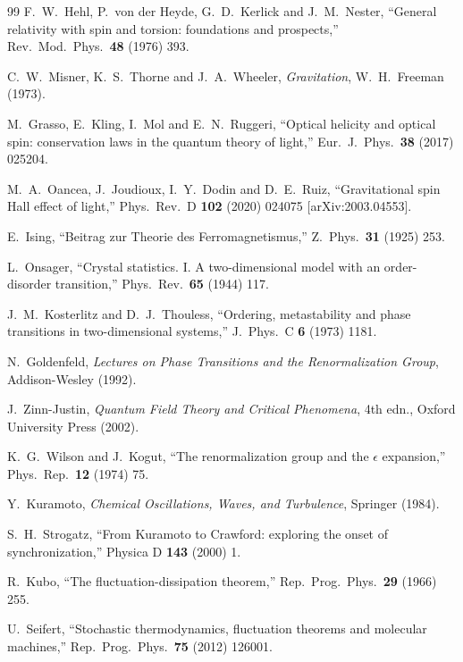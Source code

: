 \documentclass[12pt]{article}
\theoremstyle{definition}
\begin{document}
\begin{thebibliography}{99}
F.~W.~Hehl, P.~von der Heyde, G.~D.~Kerlick and J.~M.~Nester,
``General relativity with spin and torsion: foundations and prospects,''
Rev.\ Mod.\ Phys.\ \textbf{48} (1976) 393.

C.~W.~Misner, K.~S.~Thorne and J.~A.~Wheeler,
\textit{Gravitation},
W.~H.~Freeman (1973).

M.~Grasso, E.~Kling, I.~Mol and E.~N.~Ruggeri,
``Optical helicity and optical spin: conservation laws in the quantum theory
of light,''
Eur.\ J.\ Phys.\ \textbf{38} (2017) 025204.

M.~A.~Oancea, J.~Joudioux, I.~Y.~Dodin and D.~E.~Ruiz,
``Gravitational spin Hall effect of light,''
Phys.\ Rev.\ D \textbf{102} (2020) 024075 [arXiv:2003.04553].

E.~Ising,
``Beitrag zur Theorie des Ferromagnetismus,''
Z.\ Phys.\ \textbf{31} (1925) 253.

L.~Onsager,
``Crystal statistics. I. A two-dimensional model with an order-disorder
transition,''
Phys.\ Rev.\ \textbf{65} (1944) 117.

J.~M.~Kosterlitz and D.~J.~Thouless,
``Ordering, metastability and phase transitions in two-dimensional systems,''
J.\ Phys.\ C \textbf{6} (1973) 1181.

N.~Goldenfeld,
\textit{Lectures on Phase Transitions and the Renormalization Group},
Addison-Wesley (1992).

J.~Zinn-Justin,
\textit{Quantum Field Theory and Critical Phenomena},
4th edn., Oxford University Press (2002).

K.~G.~Wilson and J.~Kogut,
``The renormalization group and the $\epsilon$ expansion,''
Phys.\ Rep.\ \textbf{12} (1974) 75.

Y.~Kuramoto,
\textit{Chemical Oscillations, Waves, and Turbulence},
Springer (1984).

S.~H.~Strogatz,
``From Kuramoto to Crawford: exploring the onset of synchronization,''
Physica D \textbf{143} (2000) 1.

R.~Kubo,
``The fluctuation-dissipation theorem,''
Rep.\ Prog.\ Phys.\ \textbf{29} (1966) 255.

U.~Seifert,
``Stochastic thermodynamics, fluctuation theorems and molecular machines,''
Rep.\ Prog.\ Phys.\ \textbf{75} (2012) 126001.


\end{thebibliography}
\end{document}
